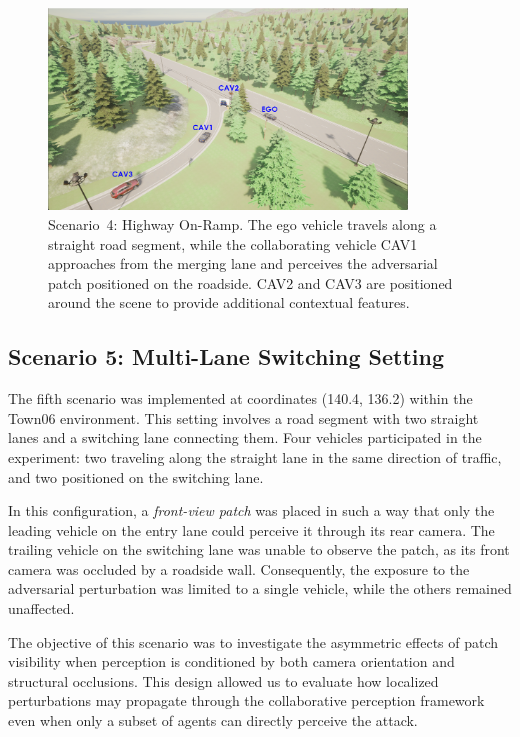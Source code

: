 \begin{figure}[H]
    \centering
    \includegraphics[width=0.85\textwidth]{figures/experiments/scenario4_v1.png}
    \caption{Scenario~4: Highway On-Ramp. The ego vehicle travels along a straight road segment, while the collaborating vehicle CAV1 approaches from the merging lane and perceives the adversarial patch positioned on the roadside. CAV2 and CAV3 are positioned around the scene to provide additional contextual features.}
    \label{fig:scenario4_onramp}
\end{figure}

\subsection{Scenario 5: Multi-Lane Switching Setting}

The fifth scenario was implemented at coordinates (140.4, 136.2) within the 
Town06 environment. This setting involves a road segment with two straight 
lanes and a switching lane connecting them. Four vehicles participated in the 
experiment: two traveling along the straight lane in the same direction of 
traffic, and two positioned on the switching lane.  

In this configuration, a \textit{front-view patch} was placed in such a way that 
only the leading vehicle on the entry lane could perceive it through its rear camera. The trailing vehicle on the switching lane was unable to 
observe the patch, as its front camera was occluded by a roadside wall.  
Consequently, the exposure to the adversarial perturbation was limited to 
a single vehicle, while the others remained unaffected.  

The objective of this scenario was to investigate the asymmetric effects of 
patch visibility when perception is conditioned by both camera orientation 
and structural occlusions. This design allowed us to evaluate how localized 
perturbations may propagate through the collaborative perception framework 
even when only a subset of agents can directly perceive the attack.  

